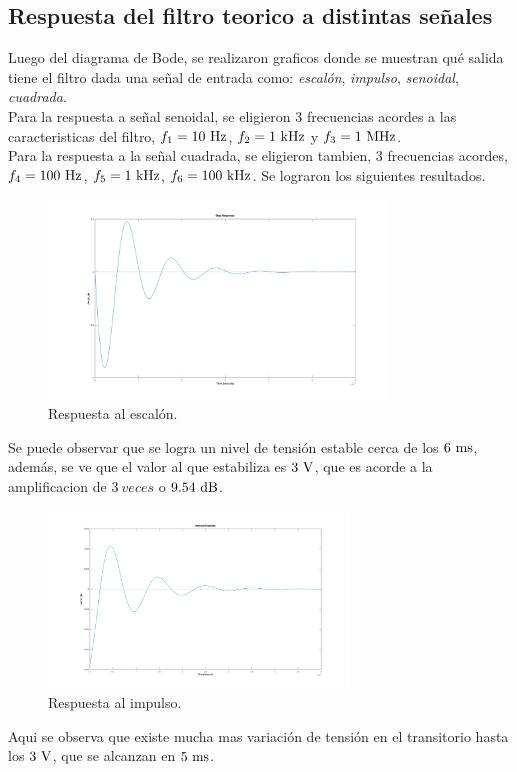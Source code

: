 \subsection*{Respuesta del filtro teorico a distintas señales}
Luego del diagrama de Bode, se realizaron graficos donde se muestran qu\'e salida tiene el filtro dada una señal de entrada como: \textit{escal\'on}, \textit{impulso}, \textit{senoidal}, \textit{cuadrada}.\\
Para la respuesta a señal senoidal, se  eligieron 3 frecuencias  acordes a las caracteristicas del filtro, $f_1=  10 \ \si{\hertz}$, $f_2= 1\ \si{\kilo\hertz}$ y $f_3 = 1 \ \si{\mega\hertz}$.\\
Para la respuesta a la señal cuadrada, se eligieron tambien,  3 frecuencias acordes, $f_4 = 100 \ \si{\hertz}$, $f_5 = 1\ \si{\kilo\hertz}$, $f_6 = 100 \ \si{\kilo\hertz}$.
Se lograron los siguientes resultados.\\

\begin{figure}[hbt]
	\centering
	\includegraphics[width=9cm]{imagenes/stepTeorico}
	\caption{Respuesta al escal\'on.}
\end{figure}
Se puede observar que se logra un nivel de tensi\'on estable cerca de los $6 \ \si{\milli\second}$, adem\'as, se ve que el valor al que estabiliza es $3 \ \si{\volt}$, que es acorde a la  amplificacion de $3\ veces$ o $9.54 \dB$.\\

\begin{figure}[hbt]
	\centering
	\includegraphics[width=8cm]{imagenes/impulseTeorico}	\caption{Respuesta al impulso.}
\end{figure}
Aqui se observa que existe mucha mas variaci\'on de tensi\'on en el transitorio hasta los $3 \ \si{\volt}$, que se alcanzan en $5 \ \si{\milli\second}$.\\


